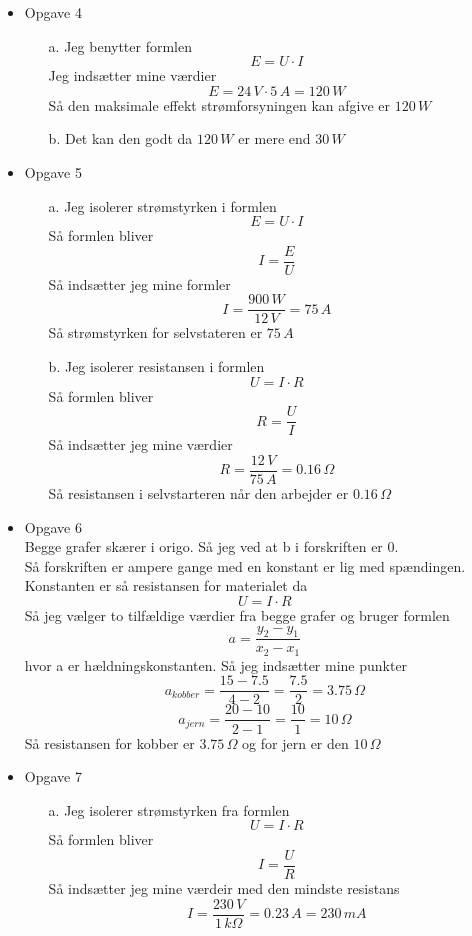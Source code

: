 \documentclass[12pt]{article}
\begin{document}
\begin{itemize}
  \item{Opgave 4}
  \begin{enumerate}
    \item[a.] Jeg benytter formlen
    $$
    E = U \cdot I
    $$
    Jeg indsætter mine værdier
    $$
    E = 24\, V \cdot 5\, A = 120\, W
    $$
    Så den maksimale effekt strømforsyningen kan afgive er $120\, W$\\

    \item[b.] Det kan den godt da $120\, W$ er mere end $30\, W$\\
  \end{enumerate}

  \item{Opgave 5}
  \begin{enumerate}
    \item[a.] Jeg isolerer strømstyrken i formlen
    $$
    E = U \cdot I
    $$
    Så formlen bliver
    $$
    I = \frac{E}{U}
    $$
    Så indsætter jeg mine formler
    $$
    I = \frac{900\, W}{12\, V} = 75\, A
    $$
    Så strømstyrken for selvstateren er $75\, A$\\

    \item[b.] Jeg isolerer resistansen i formlen
    $$
    U = I \cdot R
    $$
    Så formlen bliver
    $$
    R = \frac{U}{I}
    $$
    Så indsætter jeg mine værdier
    $$
    R = \frac{12\, V}{75\, A} = 0.16\, \Omega
    $$
    Så resistansen i selvstarteren når den arbejder er $0.16\, \Omega$\\
  \end{enumerate}

  \item{Opgave 6}\\
  Begge grafer skærer i origo. Så jeg ved at b i forskriften er 0.\\
  Så forskriften er ampere gange med en konstant er lig med spændingen. Konstanten er så resistansen for materialet da
  $$
  U = I \cdot R
  $$
  Så jeg vælger to tilfældige værdier fra begge grafer og bruger formlen
  $$
  a = \frac{y_2 - y_1}{x_2 - x_1}
  $$
  hvor a er hældningskonstanten. Så jeg indsætter mine punkter
  $$
  a_{kobber} = \frac{15-7.5}{4-2} = \frac{7.5}{2} = 3.75\, \Omega
  $$
  $$
  a_{jern} = \frac{20-10}{2-1} = \frac{10}{1} = 10\, \Omega
  $$
  Så resistansen for kobber er $3.75\, \Omega$ og for jern er den $10\, \Omega$\\

  \item{Opgave 7}
  \begin{enumerate}
    \item[a.] Jeg isolerer strømstyrken fra formlen
    $$
    U = I \cdot R
    $$
    Så formlen bliver
    $$
    I = \frac{U}{R}
    $$
    Så indsætter jeg mine værdeir med den mindste resistans
    $$
    I = \frac{230\, V}{1\, k\Omega} = 0.23\, A = 230\, mA
    $$\\


\end{enumerate}
\end{itemize}
\end{document}
